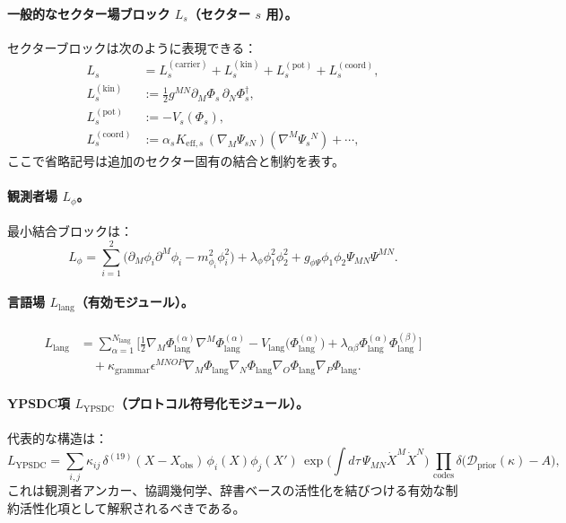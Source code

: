 \documentclass[13pt,a4paper]{ltjsarticle}
\begin{document}
	\paragraph{一般的なセクター場ブロック $L_s$（セクター $s$ 用）。}
	セクターブロックは次のように表現できる：
	\begin{align}
		L_s &= L^{(\mathrm{carrier})}_s + L^{(\mathrm{kin})}_s + L^{(\mathrm{pot})}_s + L^{(\mathrm{coord})}_s, \\
		L^{(\mathrm{kin})}_s &:= \frac{1}{2}g^{MN}\partial_M\Phi_s\,\partial_N\Phi_s^\dagger, \\
		L^{(\mathrm{pot})}_s &:= -V_s(\Phi_s), \\
		L^{(\mathrm{coord})}_s &:= \alpha_s K_{\mathrm{eff},s}\,(\nabla_M\Psi_{sN})(\nabla^M\Psi_{s}{}^{N}) + \cdots,
	\end{align}
	ここで省略記号は追加のセクター固有の結合と制約を表す。
	
	\paragraph{観測者場 $L_{\phi}$。}
	最小結合ブロックは：
	\begin{equation}
		L_{\phi}=\sum_{i=1}^{2}\Big(\partial_M\phi_i\partial^M\phi_i - m_{\phi_i}^2\phi_i^2\Big) + \lambda_{\phi}\phi_1^2\phi_2^2 + g_{\phi\Psi}\phi_1\phi_2\Psi_{MN}\Psi^{MN}.
	\end{equation}
	
	\paragraph{言語場 $L_{\mathrm{lang}}$（有効モジュール）。}
	\begin{align}
		L_{\mathrm{lang}} &= \sum_{\alpha=1}^{N_{\mathrm{lang}}}\Big[
		\frac{1}{2}\nabla_M\Phi_{\mathrm{lang}}^{(\alpha)}\nabla^M\Phi_{\mathrm{lang}}^{(\alpha)}
		- V_{\mathrm{lang}}\big(\Phi_{\mathrm{lang}}^{(\alpha)}\big)
		+ \lambda_{\alpha\beta}\Phi_{\mathrm{lang}}^{(\alpha)}\Phi_{\mathrm{lang}}^{(\beta)}
		\Big] \nonumber\\
		&\quad + \kappa_{\mathrm{grammar}}\epsilon^{MNOP}\nabla_M\Phi_{\mathrm{lang}}\nabla_N\Phi_{\mathrm{lang}}\nabla_O\Phi_{\mathrm{lang}}\nabla_P\Phi_{\mathrm{lang}}.
	\end{align}
	
	\paragraph{YPSDC項 $L_{\mathrm{YPSDC}}$（プロトコル符号化モジュール）。}
	代表的な構造は：
	\begin{equation}
		L_{\mathrm{YPSDC}} = \sum_{i,j}\kappa_{ij}\,\delta^{(19)}(X-X_{\mathrm{obs}})\,\phi_i(X)\phi_j(X')\,
		\exp\!\Big(\int d\tau\,\Psi_{MN}\dot X^M\dot X^N\Big)\,
		\prod_{\mathrm{codes}}\delta\big(\mathcal{D}_{\mathrm{prior}}(\kappa)-A\big),
	\end{equation}
	これは観測者アンカー、協調幾何学、辞書ベースの活性化を結びつける有効な制約活性化項として解釈されるべきである。
	
\end{document}
